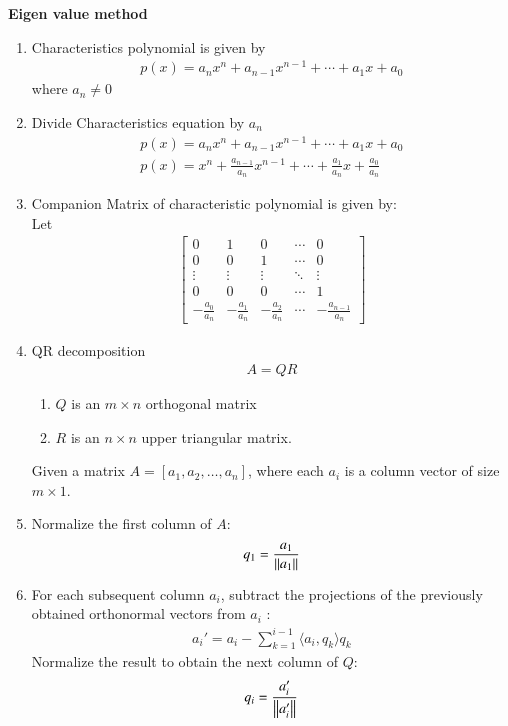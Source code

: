 \documentclass[journal]{IEEEtran}
\numberwithin{equation}{enumi}
\numberwithin{figure}{enumi}
\begin{document}
\textbf{Eigen value method}
\begin{enumerate}
\item Characteristics polynomial is given by
\begin{align}
 p(x)=a_nx^n+a_{n-1}x^{n-1}+\cdots +a_1x+a_0   
\end{align}
where $a_n \neq 0$
\item Divide Characteristics equation by $a_n$
\begin{align}
    p(x)= a_nx^n+a_{n-1}x^{n-1}+\cdots +a_1x+a_0     \\
    p(x)=x^n+\frac{a_{n-1}}{a_n}x^{n-1}+\cdots +\frac{a_1}{a_n}x+\frac{a_0}{a_n}
\end{align}
\item Companion Matrix of characteristic polynomial is given by:\\
Let
\begin{align}
    \begin{bmatrix}
0 & 1 & 0 & \cdots & 0 \\
0 & 0 & 1 & \cdots & 0 \\
\vdots & \vdots & \vdots & \ddots & \vdots \\
0 & 0 & 0 & \cdots & 1 \\
-\frac{a_0}{a_n} & -\frac{a_1}{a_n} & -\frac{a_2}{a_n} & \cdots & -\frac{a_{n-1}}{a_n}
\end{bmatrix}
\end{align}
\item QR decomposition 
\begin{align}
A = QR
\end{align}
\begin{enumerate}
    \item $Q$ is an $ m \times n $ orthogonal matrix
    \item $R$ is an $n \times n$ upper triangular matrix.
\end{enumerate}
Given a matrix $ A = [a_1, a_2, \dots, a_n] $, where each $ a_i $ is a column vector of size $ m \times 1 $.

\item Normalize the first column of $A$:
\begin{align}
q_1 = \frac{a_1}{\left\lVert a_1\right\rVert}
\end{align}

\item  For each subsequent column $ a_i $, subtract the projections of the previously obtained orthonormal vectors from $ a_i $ :
\begin{align}
a_i' = a_i - \sum_{k=1}^{i-1} \langle a_i, q_k \rangle q_k
\end{align}
Normalize the result to obtain the next column of \( Q \):
\begin{align}
q_i = \frac{a_i'}{\left\lVert a_i'\right\rVert}
\end{align}


\end{enumerate}
\end{document}
